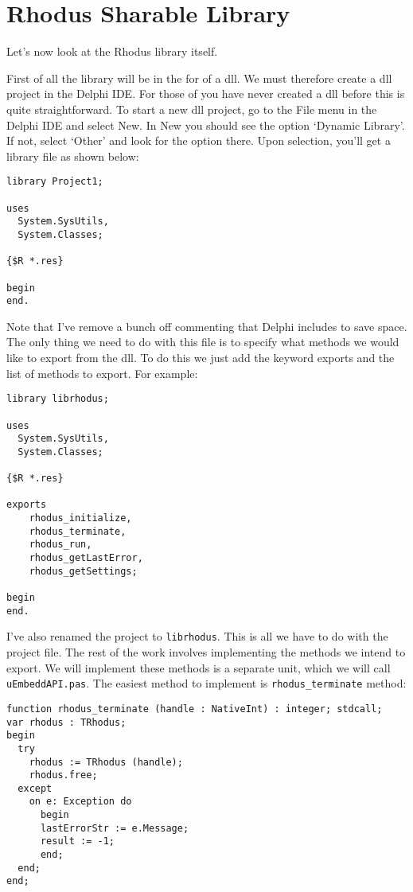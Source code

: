 \section{Rhodus Sharable Library}

Let's now look at the Rhodus library itself.

First of all the library will be in the for of a dll. We must therefore create a dll project in the Delphi IDE.  For those of you have never created a dll before this is quite straightforward. To start a new dll project, go to the File menu in the Delphi IDE and select New. In New you should see the option `Dynamic Library'. If not, select `Other' and look for the option there. Upon selection, you'll get a library file as shown below:

\begin{lstlisting}
library Project1;

uses
  System.SysUtils,
  System.Classes;

{$R *.res}

begin
end.
\end{lstlisting}

Note that I've remove a bunch off commenting that Delphi includes to save space. The only thing we need to do with this file is to specify what methods we would like to export from the dll. To do this we just add the keyword exports and the list of methods to export. For example:

\begin{lstlisting}
library librhodus;

uses
  System.SysUtils,
  System.Classes;

{$R *.res}

exports
    rhodus_initialize,
    rhodus_terminate,
    rhodus_run,
    rhodus_getLastError,
    rhodus_getSettings;

begin
end.
\end{lstlisting}

I've also renamed the project to {\tt librhodus}. This is all we have to do with the project file. The rest of the work involves implementing the methods we intend to export. We will implement these methods is a separate unit, which we will call {\tt uEmbeddAPI.pas}. The easiest method to implement is {\tt rhodus_terminate} method:

\begin{lstlisting}
function rhodus_terminate (handle : NativeInt) : integer; stdcall;
var rhodus : TRhodus;
begin
  try
    rhodus := TRhodus (handle);
    rhodus.free;
  except
    on e: Exception do
      begin
      lastErrorStr := e.Message;
      result := -1;
      end;
  end;
end;
\end{lstlisting}


